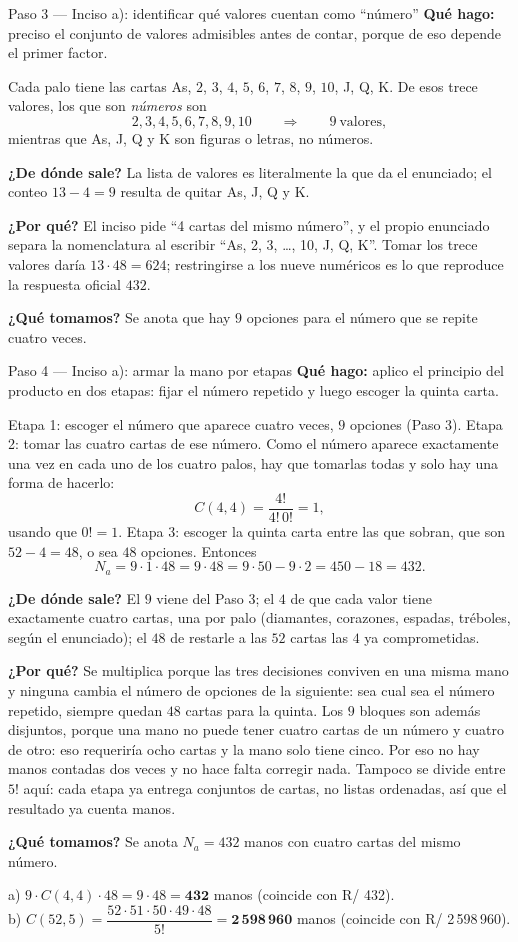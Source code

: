 \documentclass[11pt]{article}
\begin{document}
\begin{paso}{Paso 3 --- Inciso a): identificar qué valores cuentan como ``número''}
\textbf{Qué hago:} preciso el conjunto de valores admisibles antes de contar, porque de eso depende el primer factor.

Cada palo tiene las cartas As, $2$, $3$, $4$, $5$, $6$, $7$, $8$, $9$, $10$, J, Q, K. De esos trece valores, los que son \emph{números} son
\[
  2,3,4,5,6,7,8,9,10 \qquad\Longrightarrow\qquad 9\ \text{valores},
\]
mientras que As, J, Q y K son figuras o letras, no números.

\textbf{¿De dónde sale?} La lista de valores es literalmente la que da el enunciado; el conteo $13-4=9$ resulta de quitar As, J, Q y K.

\textbf{¿Por qué?} El inciso pide ``4 cartas del mismo número'', y el propio enunciado separa la nomenclatura al escribir ``As, 2, 3, \dots, 10, J, Q, K''. Tomar los trece valores daría $13\cdot 48=624$; restringirse a los nueve numéricos es lo que reproduce la respuesta oficial $432$.

\textbf{¿Qué tomamos?} Se anota que hay $9$ opciones para el número que se repite cuatro veces.
\end{paso}

\begin{paso}{Paso 4 --- Inciso a): armar la mano por etapas}
\textbf{Qué hago:} aplico el principio del producto en dos etapas: fijar el número repetido y luego escoger la quinta carta.

Etapa 1: escoger el número que aparece cuatro veces, $9$ opciones (Paso 3). Etapa 2: tomar las cuatro cartas de ese número. Como el número aparece exactamente una vez en cada uno de los cuatro palos, hay que tomarlas todas y solo hay una forma de hacerlo:
\[
  C(4,4)=\frac{4!}{4!\,0!}=1 ,
\]
usando que $0!=1$. Etapa 3: escoger la quinta carta entre las que sobran, que son $52-4=48$, o sea $48$ opciones. Entonces
\[
  N_a = 9\cdot 1\cdot 48 = 9\cdot 48 = 9\cdot 50 - 9\cdot 2 = 450-18=432 .
\]

\textbf{¿De dónde sale?} El $9$ viene del Paso 3; el $4$ de que cada valor tiene exactamente cuatro cartas, una por palo (diamantes, corazones, espadas, tréboles, según el enunciado); el $48$ de restarle a las $52$ cartas las $4$ ya comprometidas.

\textbf{¿Por qué?} Se multiplica porque las tres decisiones conviven en una misma mano y ninguna cambia el número de opciones de la siguiente: sea cual sea el número repetido, siempre quedan $48$ cartas para la quinta. Los $9$ bloques son además disjuntos, porque una mano no puede tener cuatro cartas de un número y cuatro de otro: eso requeriría ocho cartas y la mano solo tiene cinco. Por eso no hay manos contadas dos veces y no hace falta corregir nada. Tampoco se divide entre $5!$ aquí: cada etapa ya entrega conjuntos de cartas, no listas ordenadas, así que el resultado ya cuenta manos.

\textbf{¿Qué tomamos?} Se anota $N_a=432$ manos con cuatro cartas del mismo número.
\end{paso}

\begin{resp}
a) $9\cdot C(4,4)\cdot 48=9\cdot 48=\mathbf{432}$ manos (coincide con R/ 432).\\
b) $C(52,5)=\dfrac{52\cdot 51\cdot 50\cdot 49\cdot 48}{5!}=\mathbf{2\,598\,960}$ manos (coincide con R/ 2\,598\,960).
\end{resp}
\end{document}
